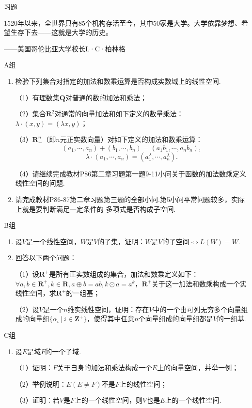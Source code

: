 \centerline{\heiti \Large 习题}
\vspace{2ex} 
{\kaishu 1520年以来，全世界只有85个机构存活至今，其中50家是大学。大学依靠梦想、希望生存下去——这就是大学的历史。}
\begin{flushright}
    \kaishu
    ——美国哥伦比亚大学校长L·C·柏林格
\end{flushright}
\centerline{\heiti A组}
\begin{enumerate}
	\item 检验下列集合对指定的加法和数乘运算是否构成实数域上的线性空间.
	
	（1）有理数集$\mathbf{Q}$对普通的数的加法和乘法；

	（2）集合$\mathbf{R}^2$对通常的向量加法和如下定义的数量乘法：$\lambda\cdot(x,y)=(\lambda x,y)$；

	（3）$\mathbf{R}_+^n$（即$n$元正实数向量）对如下定义的加法和数乘运算：
	$$(a_1,\cdots,a_n)+(b_1,\cdots,b_n)=(a_1b_1,\cdots,a_nb_n),$$
	$$\lambda\cdot(a_1,\cdots,a_n)=(a_1^\lambda,\cdots,a_n^\lambda).$$

	（4）请继续完成教材P86第二章习题第一题9-11小问关于函数的加法数乘定义线性空间的问题.
	\item 请完成教材P86-87第二章习题第三题的全部小问.第5小问平常问题较多，实际上就是要判断满足一定条件的
	多项式是否构成子空间.
\end{enumerate}
\centerline{\heiti B组}
\begin{enumerate}
	\item 设$V$是一个线性空间，$W$是$V$的子集，证明：$W$是$V$的子空间$\iff L(W)=W$.
	\item 回答以下两个问题：

	（1）设$\mathbf{R}^+$是所有正实数组成的集合，加法和数乘定义如下：$\forall a,b \in \mathbf{R}^+,k\in \mathbf{R},a\oplus b = ab, k\odot a = a^k$，$\mathbf{R}^+$关于这一加法和数乘构成一个实线性空间，求$\mathbf{R}^+$的一组基；

	（2）设$V$是一个$n$维实线性空间，证明：存在$V$中的一个由可列无穷多个向量组成的向量组$\{\alpha_i\ |\ i\in\mathbf{Z}^+\}$，使得其中任意$n$个向量组成的向量组都是$V$的一组基.
\end{enumerate}
\centerline{\heiti C组}
\begin{enumerate}
	\item 设$E$是域$F$的一个子域.
	
	（1）证明：$F$关于自身的加法和乘法构成一个$E$上的向量空间，并举一例；

	（2）举例说明：$E(E\neq F)$不是$F$上的线性空间；

	（3）证明：若$V$是$F$上的一个线性空间，则$V$也是$E$上的一个线性空间.
\end{enumerate}